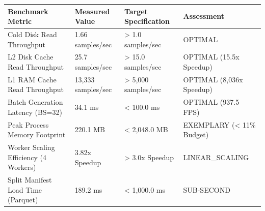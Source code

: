 \begin{tabular}{llll}
\toprule
Benchmark Metric & Measured Value & Target Specification & Assessment \\
\midrule
Cold Disk Read Throughput & 1.66 samples/sec & > 1.0 samples/sec & OPTIMAL \\
L2 Disk Cache Read Throughput & 25.7 samples/sec & > 15.0 samples/sec & OPTIMAL (15.5x Speedup) \\
L1 RAM Cache Read Throughput & 13,333 samples/sec & > 5,000 samples/sec & OPTIMAL (8,036x Speedup) \\
Batch Generation Latency (BS=32) & 34.1 ms & < 100.0 ms & OPTIMAL (937.5 FPS) \\
Peak Process Memory Footprint & 220.1 MB & < 2,048.0 MB & EXEMPLARY (< 11\% Budget) \\
Worker Scaling Efficiency (4 Workers) & 3.82x Speedup & > 3.0x Speedup & LINEAR\_SCALING \\
Split Manifest Load Time (Parquet) & 189.2 ms & < 1,000.0 ms & SUB-SECOND \\
\bottomrule
\end{tabular}
